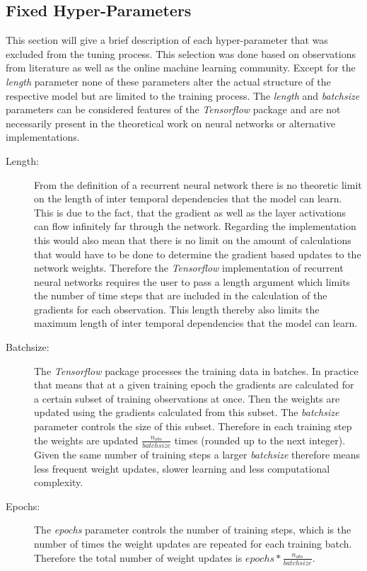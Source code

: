 \subsection{Fixed Hyper-Parameters}
This section will give a brief description of each hyper-parameter that was excluded from the tuning process. This selection was done based on observations from literature as well as the online machine learning community. Except for the \textit{length} parameter none of these parameters alter the actual structure of the respective model but are limited to the training process. The \textit{length} and \textit{batchsize} parameters can be considered features of the \textit{Tensorflow} package and are not necessarily present in the theoretical work on neural networks or alternative implementations.
\begin{description}
\item[Length:] From the definition of a recurrent neural network there is no theoretic limit on the length of inter temporal dependencies that the model can learn. This is due to the fact, that the gradient as well as the layer activations can flow infinitely far through the network. Regarding the implementation this would also mean that there is no limit on the amount of calculations that would have to be done to determine the gradient based updates to the network weights. Therefore the \textit{Tensorflow} implementation of recurrent neural networks requires the user to pass a length argument which limits the number of time steps that are included in the calculation of the gradients for each observation. This length thereby also limits the maximum length of inter temporal dependencies that the model can learn.

\item[Batchsize:] The \textit{Tensorflow} package processes the training data in batches. In practice that means that at a given training epoch the gradients are calculated for a certain subset of training observations at once. Then the weights are updated using the gradients calculated from this subset. The \textit{batchsize} parameter controls the size of this subset. Therefore in each training step the weights are updated $\frac{n_{obs}}{batchsize}$ times (rounded up to the next integer). Given the same number of training steps a larger \textit{batchsize} therefore means less frequent weight updates, slower learning and less computational complexity.

\item[Epochs:] The \textit{epochs} parameter controls the number of training steps, which is the number of times the weight updates are repeated for each training batch. Therefore the total number of weight updates is $epochs * \frac{n_{obs}}{batchsize}$. 


\end{description}
